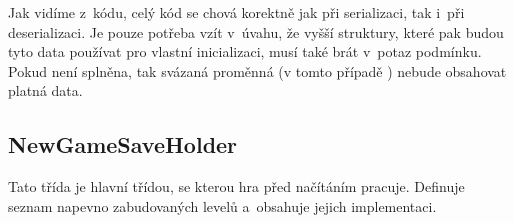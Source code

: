 Jak vidíme z~kódu, celý kód se chová korektně jak při serializaci, tak i~při deserializaci. Je pouze potřeba vzít v~úvahu, že vyšší struktury, které pak budou tyto data používat pro vlastní inicializaci, musí také brát v~potaz podmínku. Pokud není splněna, tak svázaná proměnná (v tomto případě ) nebude obsahovat platná data.

\subsection{NewGameSaveHolder}

 Tato třída je hlavní třídou, se kterou hra před načítáním pracuje. Definuje seznam napevno zabudovaných levelů a~obsahuje jejich implementaci.









